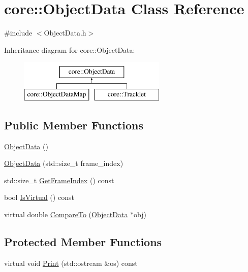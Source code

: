 \hypertarget{classcore_1_1ObjectData}{}\section{core\+:\+:Object\+Data Class Reference}
\label{classcore_1_1ObjectData}


{\ttfamily \#include $<$Object\+Data.\+h$>$}

Inheritance diagram for core\+:\+:Object\+Data\+:\begin{figure}[H]
\begin{center}
\leavevmode
\includegraphics[height=2.000000cm]{classcore_1_1ObjectData}
\end{center}
\end{figure}
\subsection*{Public Member Functions}
\begin{DoxyCompactItemize}
\item 
\hyperlink{classcore_1_1ObjectData_a7f47a396a3b9e8c12a1557c8156b8ff9}{Object\+Data} ()
\item 
\hyperlink{classcore_1_1ObjectData_af4333a52b012841a6ba73b25aeaae71b}{Object\+Data} (std\+::size\+\_\+t frame\+\_\+index)
\item 
std\+::size\+\_\+t \hyperlink{classcore_1_1ObjectData_a1151e9215baf315f4b98f696f4271162}{Get\+Frame\+Index} () const
\item 
bool \hyperlink{classcore_1_1ObjectData_a2880d710cfa520e9c0453e2a6729c0e2}{Is\+Virtual} () const
\item 
virtual double \hyperlink{classcore_1_1ObjectData_a01f04d64b1e62f567d819a8fcbe38319}{Compare\+To} (\hyperlink{classcore_1_1ObjectData}{Object\+Data} $\ast$obj)
\end{DoxyCompactItemize}
\subsection*{Protected Member Functions}
\begin{DoxyCompactItemize}
\item 
virtual void \hyperlink{classcore_1_1ObjectData_aa26949b0456068d67802d9f6067aa657}{Print} (std\+::ostream \&os) const
\end{DoxyCompactItemize}
